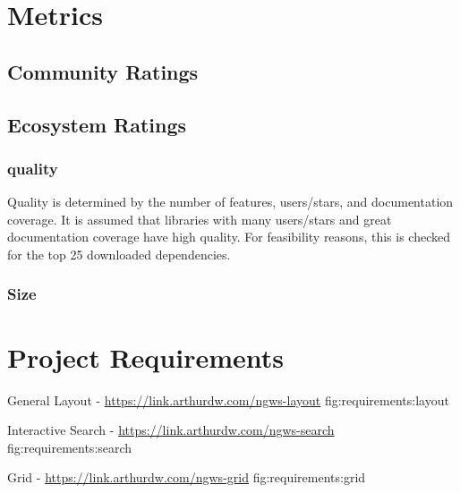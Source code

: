 \chapter{Metrics}

\section{Community Ratings}
\label{app:metrics:community}


\section{Ecosystem Ratings}

\subsection{quality}
\label{app:metrics:ecosystem:quality}

Quality is determined by the number of features, users/stars, and documentation coverage. It is assumed that libraries with many users/stars and great documentation coverage have high quality. For feasibility reasons, this is checked for the top 25 downloaded dependencies.


\subsection{Size}
\label{app:metrics:ecosystem:size}



\chapter{Project Requirements}

    {General Layout - \url{https://link.arthurdw.com/ngws-layout}}
    {fig:requirements:layout}

    {Interactive Search - \url{https://link.arthurdw.com/ngws-search}}
    {fig:requirements:search}

    {Grid - \url{https://link.arthurdw.com/ngws-grid}}
    {fig:requirements:grid}

